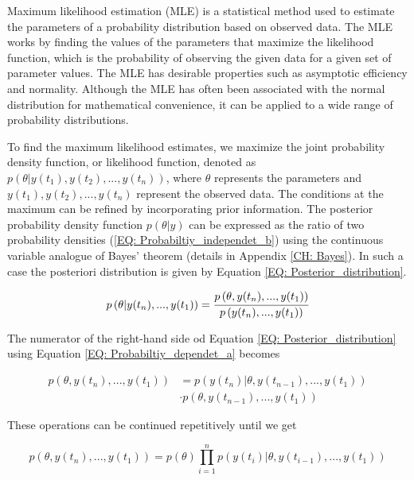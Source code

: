 \documentclass[../Article_Model_Parameters.tex]{subfiles}
\begin{document}
	
	Maximum likelihood estimation (MLE) is a statistical method used to estimate the parameters of a probability distribution based on observed data. The MLE works by finding the values of the parameters that maximize the likelihood function, which is the probability of observing the given data for a given set of parameter values. The MLE has desirable properties such as asymptotic efficiency and normality. Although the MLE has often been associated with the normal distribution for mathematical convenience, it can be applied to a wide range of probability distributions.
	
	To find the maximum likelihood estimates, we maximize the joint probability density function, or likelihood function, denoted as $p(\theta | y(t_1),y(t_2),...,y(t_n))$, where $\theta$ represents the parameters and $y(t_1),y(t_2),...,y(t_n)$ represent the observed data. The conditions at the maximum can be refined by incorporating prior information. The posterior probability density function $p(\theta|y)$ can be expressed as the ratio of two probability densities (\ref{EQ: Probabiltiy_independet_b}) using the continuous variable analogue of Bayes' theorem (details in Appendix \ref{CH: Bayes}). In such a case the posteriori distribution is given by Equation \ref{EQ: Posterior_distribution}.
	
	{\footnotesize
		\begin{align} \label{EQ: Posterior_distribution}
			p\left( \theta| y(t_n),...,y(t_1) \right) = \cfrac{p\left( \theta, y(t_n),...,y(t_1) \right)}{p\left( y(t_n),...,y(t_1) \right)}
	\end{align} }
	
	The numerator of the right-hand side od Equation \ref{EQ: Posterior_distribution} using Equation \ref{EQ: Probabiltiy_dependet_a} becomes 
	
	{\footnotesize
		\begin{equation}
			\begin{split}
				p\left( \theta,y(t_n),...,y(t_1) \right) &= p\left( y(t_n)|\theta,y(t_{n-1}),...,y(t_1) \right) \\ &\cdot p\left( \theta,y(t_{n-1}),...,y(t_1) \right)
			\end{split}
	\end{equation} }
	
	These operations can be continued repetitively until we get
	
	{\footnotesize
		\begin{equation}
			p\left( \theta, y(t_n),...,y(t_1) \right) = p\left( \theta \right) \prod_{i=1}^{n} p\left( y(t_i)|\theta, y(t_{i-1}),...,y(t_1) \right)
	\end{equation} }
	
\end{document}
